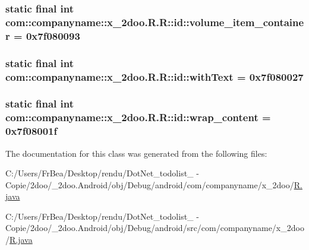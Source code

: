 \hypertarget{classcom_1_1companyname_1_1x__2doo_1_1_r_1_1id_93200752dc7132b43a211dffde5a52fe}{
\subsubsection[{volume\_\-item\_\-container}]{\setlength{\rightskip}{0pt plus 5cm}static final int com::companyname::x\_\-2doo.R.R::id::volume\_\-item\_\-container = 0x7f080093}}
\label{classcom_1_1companyname_1_1x__2doo_1_1_r_1_1id_93200752dc7132b43a211dffde5a52fe}


\hypertarget{classcom_1_1companyname_1_1x__2doo_1_1_r_1_1id_211b058acebaf12aaf993395067d190e}{
\subsubsection[{withText}]{\setlength{\rightskip}{0pt plus 5cm}static final int com::companyname::x\_\-2doo.R.R::id::withText = 0x7f080027}}
\label{classcom_1_1companyname_1_1x__2doo_1_1_r_1_1id_211b058acebaf12aaf993395067d190e}


\hypertarget{classcom_1_1companyname_1_1x__2doo_1_1_r_1_1id_64af69cbc210b18c0df870be84e1d559}{
\subsubsection[{wrap\_\-content}]{\setlength{\rightskip}{0pt plus 5cm}static final int com::companyname::x\_\-2doo.R.R::id::wrap\_\-content = 0x7f08001f}}
\label{classcom_1_1companyname_1_1x__2doo_1_1_r_1_1id_64af69cbc210b18c0df870be84e1d559}




The documentation for this class was generated from the following files:\begin{CompactItemize}
\item 
C:/Users/FrBea/Desktop/rendu/DotNet\_\-todolist\_ - Copie/2doo/\_\-2doo.Android/obj/Debug/android/com/companyname/x\_\-2doo/\hyperlink{com_2companyname_2x__2doo_2_r_8java}{R.java}\item 
C:/Users/FrBea/Desktop/rendu/DotNet\_\-todolist\_ - Copie/2doo/\_\-2doo.Android/obj/Debug/android/src/com/companyname/x\_\-2doo/\hyperlink{src_2com_2companyname_2x__2doo_2_r_8java}{R.java}\end{CompactItemize}
